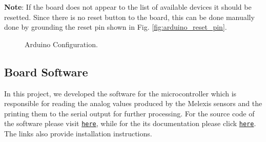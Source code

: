 \vspace{1em}
\noindent \textbf{Note}: If the board does not appear to the list of available devices
it should be resetted. Since there is no reset button to the board, this 
can be done manually done by grounding the reset pin shown in Fig. 
\ref{fig:arduino_reset_pin}.
\begin{figure}[t]
    \centering
    \qquad
    \caption{Arduino Configuration.}
\end{figure}

\subsection{Board Software}
\label{board_software}
In this project, we developed the software for the microcontroller which 
is responsible for reading the analog values produced by the 
Melexis sensors and the printing them to the serial output for further 
processing. For the source code of the software please visit 
\texttt{\href{https://github.com/amartsop/Exoskeleton}{here}},
while for the its documentation please click 
\texttt{\href{https://amartsop.github.io/Exoskeleton/index.html}{here}}.
The links also provide installation instructions.

